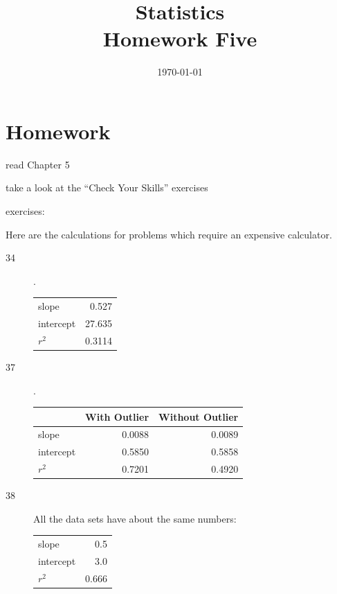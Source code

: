\documentclass[letterpaper, landscape]{exam}
\title{Statistics \\ Homework Five}
\date{\today}
\author{}
\begin{document}
  \maketitle

  \section{Homework}
    \begin{itemize*}
      \item read Chapter 5 
      \item take a look at the ``Check Your Skills'' exercises
      \item exercises: 
    \end{itemize*}

  \ifprintanswers
  \else
    Here are the calculations for problems which require an expensive
    calculator.

    \begin{description}
      \item[34] .

        \begin{tabular}[H]{lr}
          \toprule
          slope     & 0.527 \\
          intercept & 27.635 \\
          $r^2$     & 0.3114 \\
          \bottomrule
        \end{tabular}

      \item[37] .

        \begin{tabular}[H]{lrr}
          \toprule
                    & With Outlier & Without Outlier \\
          \midrule
          slope     & 0.0088       & 0.0089 \\
          intercept & 0.5850       & 0.5858 \\
          $r^2$     & 0.7201       & 0.4920 \\
          \bottomrule
        \end{tabular}

      \item[38]
        All the data sets have about the same numbers:

        \begin{tabular}[H]{lr}
          \toprule
          slope     & 0.5   \\
          intercept & 3.0   \\
          $r^2$     & 0.666 \\
          \bottomrule
        \end{tabular}
    \end{description}
  \fi
\end{document}
